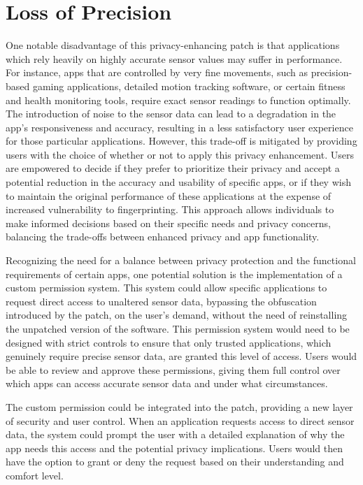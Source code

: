 \documentclass[11pt,
  oneside,openany,    %
]{scrreprt}
\begin{document}
\section{Loss of Precision}
\label{sec:loss_of_precision}
One notable disadvantage of this privacy-enhancing patch is that applications which rely heavily on highly accurate sensor values may suffer in performance. For instance, apps that are controlled by very fine movements, such as precision-based gaming applications, detailed motion tracking software, or certain fitness and health monitoring tools, require exact sensor readings to function optimally. 
The introduction of noise to the sensor data can lead to a degradation in the app's responsiveness and accuracy, resulting in a less satisfactory user experience for those particular applications. However, this trade-off is mitigated by providing users with the choice of whether or not to apply this privacy enhancement.
Users are empowered to decide if they prefer to prioritize their privacy and accept a potential reduction in the accuracy and usability of specific apps, or if they wish to maintain the original performance of these applications at the expense of increased vulnerability to fingerprinting.
This approach allows individuals to make informed decisions based on their specific needs and privacy concerns, balancing the trade-offs between enhanced privacy and app functionality.

Recognizing the need for a balance between privacy protection and the functional requirements of certain apps, one potential solution is the implementation of a custom permission system. 
This system could allow specific applications to request direct access to unaltered sensor data, bypassing the obfuscation introduced by the patch, on the user’s demand, without the need of reinstalling the unpatched version of the software.
This permission system would need to be designed with strict controls to ensure that only trusted applications, which genuinely require precise sensor data, are granted this level of access. 
Users would be able to review and approve these permissions, giving them full control over which apps can access accurate sensor data and under what circumstances.

The custom permission could be integrated into the patch, providing a new layer of security and user control. 
When an application requests access to direct sensor data, the system could prompt the user with a detailed explanation of why the app needs this access and the potential privacy implications. 
Users would then have the option to grant or deny the request based on their understanding and comfort level.
\end{document}
